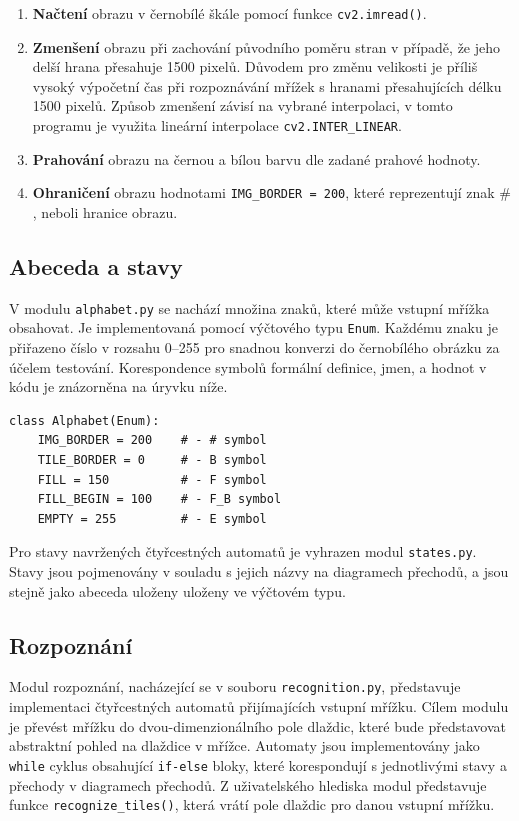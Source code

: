 \begin{enumerate}
    \item \textbf{Načtení} obrazu v černobílé škále pomocí funkce \verb|cv2.imread()|.
    \item \textbf{Zmenšení} obrazu při zachování původního poměru stran v případě, že jeho delší hrana přesahuje 1500 pixelů. Důvodem pro změnu velikosti je příliš vysoký výpočetní čas při rozpoznávání mřížek s hranami přesahujících délku 1500 pixelů. Způsob zmenšení závisí na vybrané interpolaci, v tomto programu je využita lineární interpolace \verb|cv2.INTER_LINEAR|.
    \item \textbf{Prahování} obrazu na černou a bílou barvu dle zadané prahové hodnoty.
    \item \textbf{Ohraničení} obrazu hodnotami \verb|IMG_BORDER = 200|, které reprezentují znak $\#$, neboli hranice obrazu.
\end{enumerate}

\subsection*{Abeceda a stavy}

V modulu \verb|alphabet.py| se nachází množina znaků, které může vstupní mřížka obsahovat. Je implementovaná pomocí výčtového typu \verb|Enum|. Každému znaku je přiřazeno číslo v rozsahu 0--255 pro snadnou konverzi do černobílého obrázku za účelem testování. Korespondence symbolů formální definice, jmen, a hodnot v kódu je znázorněna na úryvku níže.

\begin{verbatim}
class Alphabet(Enum):
    IMG_BORDER = 200    # - # symbol
    TILE_BORDER = 0     # - B symbol
    FILL = 150          # - F symbol
    FILL_BEGIN = 100    # - F_B symbol
    EMPTY = 255         # - E symbol
\end{verbatim}

Pro stavy navržených čtyřcestných automatů je vyhrazen modul \verb|states.py|. Stavy jsou pojmenovány v souladu s jejich názvy na diagramech přechodů, a jsou stejně jako abeceda uloženy uloženy ve výčtovém typu.

\subsection*{Rozpoznání}

Modul rozpoznání, nacházející se v souboru \verb|recognition.py|, představuje implementaci čtyřcestných automatů přijímajících vstupní mřížku. Cílem modulu je převést mřížku do dvou-dimenzionálního pole dlaždic, které bude představovat abstraktní pohled na dlaždice v mřížce. Automaty jsou implementovány jako \verb|while| cyklus obsahující \verb|if-else| bloky, které korespondují s jednotlivými stavy a přechody v diagramech přechodů. Z uživatelského hlediska modul představuje funkce \verb|recognize_tiles()|, která vrátí pole dlaždic pro danou vstupní mřížku.

